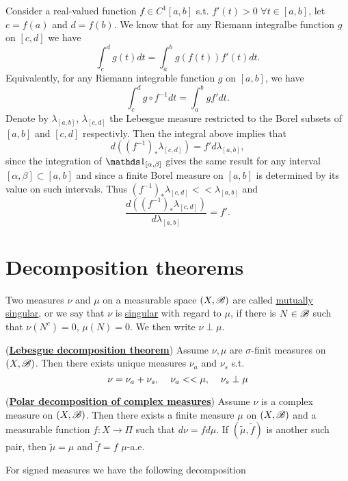 \begin{example}
    Consider a real-valued function $f\in C^1[a,b]$ s.t. $f'(t)>0$ $\forall t\in [a,b]$, let $c=f(a)$ and $d=f(b)$. We know that for any Riemann
    integralbe function $g$ on $[c,d]$ we have 
    $$\int_c^d g(t)dt = \int_a^b g(f(t))f'(t)dt.$$
    Equivalently, for any Riemann integrable function $g$ on $[a,b]$, we have $$\int_c^d g\circ f^{-1} dt = \int_a^b g f'dt.$$
    Denote by $\lambda_{[a,b]}$, $\lambda_{[c,d]}$ the Lebesgue measure restricted to the Borel subsets of $[a,b]$ and $[c,d]$ respectivly. Then the integral
    above implies that $$d((f^{-1})_* \lambda_{[c,d]}) = f'd\lambda_{[a,b]},$$
    since the integration of $\one_{[\alpha,\beta]}$ gives the same result for any interval $[\alpha,\beta]\subset [a,b]$ and since a finite Borel measure on $[a,b]$
    is determined by its value on such intervals. Thus $(f^{-1})_* \lambda_{[c,d]}<<\lambda_{[a,b]}$ and $$\frac{d((f^{-1})_* \lambda_{[c,d]})}{d\lambda_{[a,b]}} = f'.$$
\end{example}




\section*{Decomposition theorems}
\begin{definition}
    Two measures $\nu$ and $\mu$ on a measurable space $(X,\mathscr{B})$ are called \underline{mutually singular}, or we say that 
    $\nu$ is \underline{singular} with regard to $\mu$, if there is $N\in\mathscr{B}$ such that $\nu(N^c)=0$, $\mu(N)=0$. 
    We then write $\nu\perp\mu$.
\end{definition}

\begin{theorem}(\underline{\textbf{Lebesgue decomposition theorem}})
    Assume $\nu,\mu$ are $\sigma$-finit measures on $(X,\mathscr{B})$. Then there exists unique measures 
    $\nu_a$ and $\nu_s$ s.t. $$\nu = \nu_a +\nu_s,\hspace{4mm} \nu_a<<\mu,\hspace{4mm} \nu_s\perp\mu$$
    
\end{theorem}

\begin{theorem}(\underline{\textbf{Polar decomposition of complex measures}})
    Assume $\nu$ is a complex measure on $(X,\mathscr{B})$. Then there exists a finite measure $\mu$ on $(X,\mathscr{B})$ and a measurable function 
    $f:X\rightarrow \Pi$ such that $d\nu = fd\mu$. If $(\tilde\mu,\tilde f)$ is another such pair, then $\tilde\mu=\mu$ and $\tilde f=f$ $\mu$-a.e.
\end{theorem}
For signed measures we have the following decomposition

